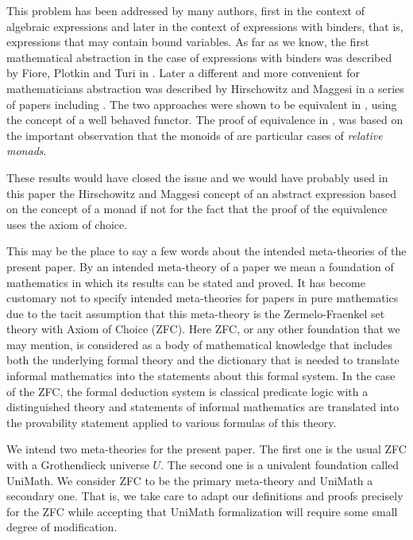 \documentclass[12pt]{amsart}
\begin{document}
This problem has been addressed by many authors, first in the context of algebraic expressions and later in the context of expressions with binders, that is, expressions that may contain bound variables. As far as we know, the first mathematical abstraction in the case of expressions with binders was described by Fiore, Plotkin and Turi in \cite{FPT}. Later a different and more convenient for mathematicians abstraction was described by Hirschowitz and Maggesi in a series of papers including \cite{HM2010}. 
The two approaches were shown to be equivalent in \cite{ACU}, \cite{ACU2} using the concept of a well behaved functor. 
The proof of equivalence in \cite{ACU}, \cite{ACU2} was based on the important observation that the monoids of \cite{FPT} are particular cases of {\em relative monads}. 

These results would have closed the issue and we would have probably used in this paper the Hirschowitz and Maggesi concept of an abstract expression based on the concept of a monad if not for the fact that the proof of the equivalence uses the axiom of choice.  

This may be the place to say a few words about the intended meta-theories of the present paper. By an intended meta-theory of a paper we mean a foundation of mathematics in which its results can be stated and proved. It has become customary not to specify intended meta-theories for papers in pure mathematics due to the tacit assumption that this meta-theory is the Zermelo-Fraenkel set theory with Axiom of Choice (ZFC). Here ZFC, or any other foundation that we may mention, is considered as a body of mathematical knowledge that includes both the underlying formal theory and the dictionary that is needed to translate informal mathematics into the statements about this formal system. In the case of the ZFC, the formal deduction system is classical predicate logic with a distinguished theory and statements of informal mathematics are translated into the provability statement applied to various formulas of this theory. 

We intend two meta-theories for the present paper. The first one is the usual ZFC with a Grothendieck universe $U$. The second one is a  univalent foundation called UniMath. We consider ZFC to be the primary meta-theory and UniMath a secondary one. That is, we take care to adapt our definitions and proofs precisely for the ZFC while accepting that UniMath formalization will require some small degree of modification.
\end{document}
